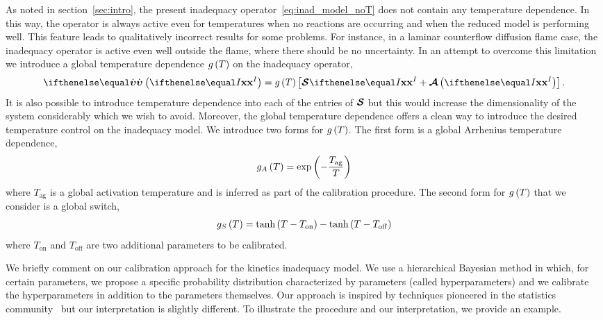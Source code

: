 \documentclass[fontsize=12pt, %
               paper=a4, %
               hyperref]{report}
\begin{document}
  As noted in section~\ref{sec:intro}, the present inadequacy
  operator~\eqref{eq:inad_model_noT} does not contain any temperature
  dependence.  In this way, the operator is always active even for
  temperatures when no reactions are occurring and when the reduced model
  is performing well.  This feature leads to qualitatively incorrect
  results for some problems.  For instance, in a laminar counterflow
  diffusion flame case, the inadequacy operator is active even well
  outside the flame, where there should be no uncertainty.  In an
  attempt to overcome this limitation we introduce a global temperature
  dependence $g\left(T\right)$ on the inadequacy operator,
  \begin{align}
    \rri\lr{\xc[I]} = g\lr{T}\left[\Sop\xc[I] + \Aop\lr{\xc[I]}\right]. \label{eq:inad_model_T}
  \end{align}
  It is also possible to introduce temperature dependence into each of the entries of $\boldsymbol{\mathcal{S}}$ 
  but this would increase the dimensionality of the system considerably which we wish to 
  avoid.  Moreover, the global temperature dependence offers a clean way to introduce the 
  desired temperature control on the inadequacy model.  We introduce two forms for $g\left(T\right)$.  
  The first form is a global Arrhenius temperature dependence, 
  \begin{align}
    g_{A}\left(T\right) = \exp\left(-\frac{T_{\mathrm{ag}}}{T}\right) \label{eq:gA}
  \end{align}
  where $T_{\mathrm{ag}}$ is a global activation temperature and is inferred as part of the 
  calibration procedure.  The second form for $g\left(T\right)$ that we consider is a global 
  switch, 
  \begin{align}
    g_{S}\left(T\right) = \tanh\left(T - T_{\mathrm{on}}\right) - \tanh\left(T - T_{\mathrm{off}}\right) \label{eq:gS}
  \end{align}
  where $T_{\mathrm{on}}$ and $T_{\mathrm{off}}$ are two additional parameters to be calibrated.

  We briefly comment on our calibration approach for the kinetics inadequacy model.  We use a 
  hierarchical Bayesian method in which, for certain parameters, we propose a specific 
  probability distribution characterized by parameters (called hyperparameters) and we calibrate the 
  hyperparameters in addition to the parameters themselves.  Our approach is inspired by 
  techniques pioneered in the statistics community~\cite{berliner1996hierarchical} but our 
  interpretation is slightly different.  To illustrate the procedure and our interpretation, 
  we provide an example.
  
\end{document}
